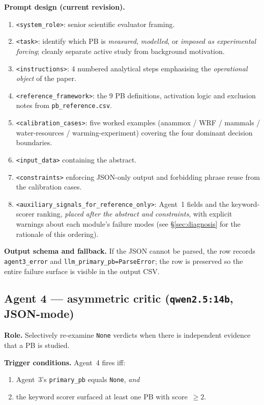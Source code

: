 \documentclass[11pt,a4paper]{article}
\begin{document}
\textbf{Prompt design (current revision).}
\begin{enumerate}\itemsep0pt
\item \texttt{<system\_role>}: senior scientific evaluator framing.
\item \texttt{<task>}: identify which PB is \emph{measured}, \emph{modelled}, or \emph{imposed as experimental forcing}; cleanly separate active study from background motivation.
\item \texttt{<instructions>}: 4 numbered analytical steps emphasising the \emph{operational object} of the paper.
\item \texttt{<reference\_framework>}: the 9 PB definitions, activation logic and exclusion notes from \texttt{pb\_reference.csv}.
\item \texttt{<calibration\_cases>}: five worked examples (anammox / WRF / mammals / water-resources / warming-experiment) covering the four dominant decision boundaries.
\item \texttt{<input\_data>} containing the abstract.
\item \texttt{<constraints>} enforcing JSON-only output and forbidding phrase reuse from the calibration cases.
\item \texttt{<auxiliary\_signals\_for\_reference\_only>}: Agent~1 fields and the keyword-scorer ranking, \emph{placed after the abstract and constraints}, with explicit warnings about each module's failure modes (see \S\ref{sec:diagnosis} for the rationale of this ordering).
\end{enumerate}

\textbf{Output schema and fallback.} If the JSON cannot be parsed, the row records \texttt{agent3\_error} and \texttt{llm\_primary\_pb=ParseError}; the row is preserved so the entire failure surface is visible in the output CSV.

\subsection{Agent 4 --- asymmetric critic (\texttt{qwen2.5:14b}, JSON-mode)}\label{subsec:agent4}

\textbf{Role.} Selectively re-examine \texttt{None} verdicts when there is independent evidence that a PB is studied.

\textbf{Trigger conditions.} Agent~4 fires iff:
\begin{enumerate}\itemsep0pt
\item Agent~3's \texttt{primary\_pb} equals \texttt{None}, \emph{and}
\item the keyword scorer surfaced at least one PB with score~$\geq 2$.
\end{enumerate}
\end{document}
